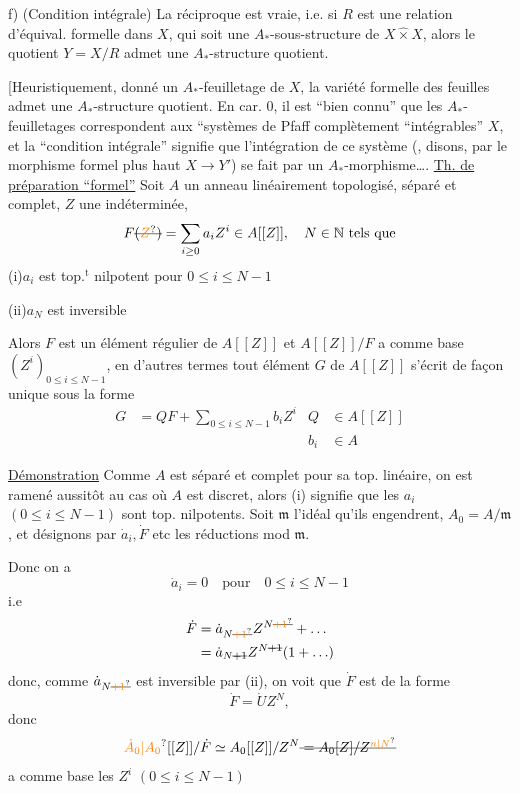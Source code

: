 f) (Condition intégrale) La réciproque est vraie, i.e. si $R$ est une relation d'équival. formelle dans $X$, qui soit une $A_*$-sous-structure de $X\mathbin{\widehat{\times}}X$, alors
le quotient  $Y=X/R$ admet une $A_*$-structure quotient.

[Heuristiquement,  donné un $A_*$-feuilletage de $X$, la variété formelle des feuilles admet une $A_*$-structure quotient. En car. 0, il est ``bien connu'' que les $A_*$-feuilletages correspondent aux ``systèmes de Pfaff complètement ``intégrables''  $X$, et la ``condition intégrale'' signifie que l'intégration de ce système (, disons, par le morphisme formel plus haut $X\to Y'$) se fait par un $A_*$-morphisme\ldots.
\uline{Th. de préparation ``formel''} Soit $A$ un anneau linéairement topologisé, séparé et complet, $Z$ une indéterminée,
\[
F\deleted{(\unsure{Z})}=\sum_{i\geq 0}a_i Z^i\in A[[Z]],\quad N\in\mathbb N\ \text{tels que}
\]
(i)\qquad $a_i$ est top.$^{\mathrm t}$ nilpotent pour $0\leq i\leq N-1$

(ii)\qquad $a_N$ est inversible

Alors $F$ est un élément régulier de $A[[Z]]$ et $A[[Z]]/F$ a comme base $(Z^i)_{0\leq i\leq N-1}$, en d'autres termes tout élément $G$ de $A[[Z]]$ s'écrit de façon unique sous la forme
\[
\begin{aligned}
G&=QF+\sum_{0\leq i\leq N-1}b_iZ^i & Q&\in A[[Z]]\\
&&b_i&\in A
\end{aligned}
\]

\uline{Démonstration} Comme $A$ est séparé et complet pour sa top. linéaire, on est ramené aussitôt au cas où $A$ est discret, alors (i) signifie que les $a_i$ $(0\leq i\leq N-1)$ sont top. nilpotents. Soit $\mathfrak m$ l'idéal  qu'ils engendrent, $A_0=A/\mathfrak m$, et désignons par $\dot a_i,\dot F$ etc les réductions mod $\mathfrak m$.

 Donc on a 
\[
\dot a_i=0\quad\text{pour}\quad 0\leq i\leq N-1
\]
i.e
\[
\begin{aligned}
\dot F&=\dot a_{N\deleted{\unsure{+1}}}Z^{N\deleted{\unsure{+1}}}+\ldots\\
&=\dot a_{N\deleted{+1}}Z^{N\deleted{+1}}(1+\ldots)
\end{aligned}
\]
donc, comme $\dot a_{N\deleted{\unsure{+1}}}$ est inversible par (ii), on voit que $\dot F$ est de la forme
\[
\dot F=\dot U Z^N,
\]
 donc
\[
\unsure{\dot A_0|A_0}[[Z]]/\dot F\simeq A_0[[Z]]/Z^N\deleted{{}=A_0[Z]/Z^{\unsure{n|N}}}
\]
a comme base les $Z^i$ $(0\leq i\leq N-1)$

